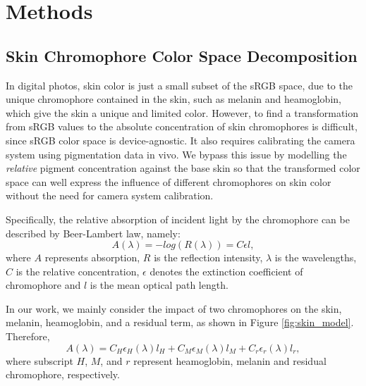 
\chapter{Methods}
\begin{spacing}{1.5}
\setlength{\parskip}{0.3in}


\section{Skin Chromophore Color Space Decomposition}
In digital photos, skin color is just a small subset of the sRGB space, due to the unique chromophore contained in the skin, such as melanin and heamoglobin, which give the skin a unique and limited color. However, to find a transformation from sRGB values to the absolute concentration of skin chromophores is difficult, since sRGB color space is device-agnostic. It also requires calibrating the camera system using pigmentation data in vivo. We bypass this issue by modelling the \textit{relative} pigment concentration against the base skin so that the transformed color space can well express the influence of different chromophores on skin color without the need for camera system calibration.

Specifically, the relative absorption of incident light by the chromophore can be described by Beer-Lambert law, namely:
\begin{equation}
    A(\lambda) = -log(R(\lambda)) = C\epsilon l,
    \label{eq1}
\end{equation}
where $A$ represents absorption, $R$ is the reflection intensity, $\lambda$ is the wavelengths, $C$ is the relative concentration, $\epsilon$ denotes the extinction coefficient of chromophore and $l$ is the mean optical path length.

In our work, we mainly consider the impact of two chromophores on the skin, melanin, heamoglobin, and a residual term, as shown in Figure \ref{fig:skin_model}. Therefore,
\begin{equation}
    A(\lambda) = C_H\epsilon_H(\lambda)l_H + C_M\epsilon_M(\lambda)l_M + C_r\epsilon_r(\lambda)l_r,
    \label{eq2}
\end{equation}
where subscript $H$, $M$, and $r$ represent heamoglobin, melanin and residual chromophore, respectively.


\end{spacing}
